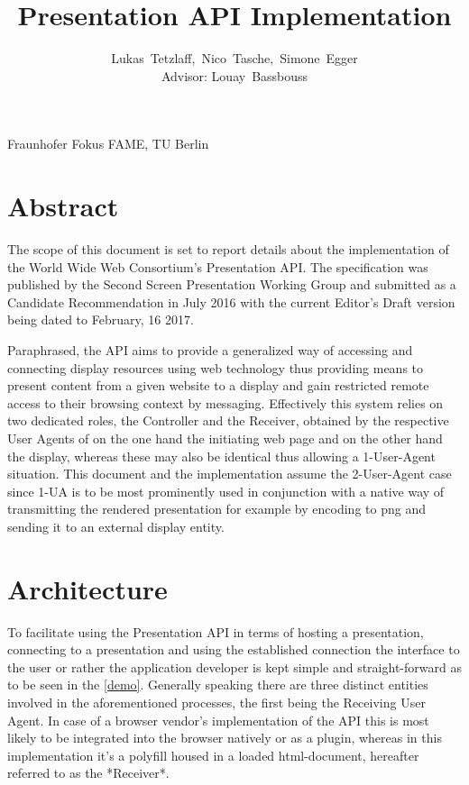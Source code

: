 \documentclass[journal]{IEEEtran}
\begin{document}
\title{Presentation API Implementation}

\author{Lukas~Tetzlaff,~Nico~Tasche,~Simone~Egger\\Advisor: Louay~Bassbouss}
{Fraunhofer Fokus FAME, TU Berlin}\maketitle
\section{Abstract}
\label{abstract}
The scope of this document is set to report details about the implementation of the World Wide Web Consortium's Presentation API. The specification was published by the Second Screen Presentation Working Group and submitted as a Candidate Recommendation in July 2016 with the current Editor's Draft version being dated to February, 16 2017.

Paraphrased, the API aims to provide a generalized way of accessing and connecting display resources using web technology thus providing means to present content from a given website to a display and gain restricted remote access to their browsing context by messaging. Effectively this system relies on two dedicated roles, the Controller and the Receiver, obtained by the respective User Agents of on the one hand the initiating web page and on the other hand the display, whereas these may also be identical thus allowing a 1-User-Agent situation. This document and the implementation assume the  2-User-Agent case since 1-UA is to be most prominently used in conjunction with a native way of transmitting the rendered presentation for example by encoding to png and sending it to an external display entity.
\section{Architecture}
\label{architecture}
To facilitate using the Presentation API in terms of hosting a presentation, connecting to a presentation and using the established connection the interface to the user or rather the application developer is kept simple and straight-forward as to be seen in the  \ref{demo}. Generally speaking there are three distinct entities involved in the aforementioned processes, the first being the Receiving User Agent. In case of a browser vendor's implementation of the API this is most likely to be integrated into the browser natively or as a plugin, whereas in this implementation it's a polyfill housed in a loaded html-document, hereafter referred to as the *Receiver*.
\end{document}

